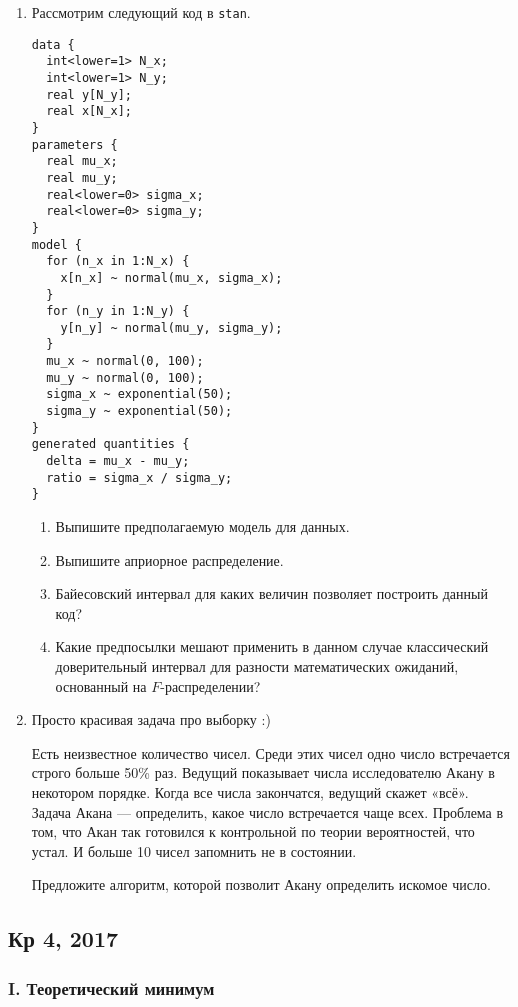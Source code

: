 \begin{enumerate}
\item Рассмотрим следующий код в \verb|stan|.

\begin{verbatim}
data {
  int<lower=1> N_x;
  int<lower=1> N_y;
  real y[N_y];
  real x[N_x];
}
parameters {
  real mu_x;
  real mu_y;
  real<lower=0> sigma_x;
  real<lower=0> sigma_y;
}
model {
  for (n_x in 1:N_x) {
    x[n_x] ~ normal(mu_x, sigma_x);
  }
  for (n_y in 1:N_y) {
    y[n_y] ~ normal(mu_y, sigma_y);
  }
  mu_x ~ normal(0, 100);
  mu_y ~ normal(0, 100);
  sigma_x ~ exponential(50);
  sigma_y ~ exponential(50);
}
generated quantities {
  delta = mu_x - mu_y;
  ratio = sigma_x / sigma_y;
}
\end{verbatim}

\begin{enumerate}
\item Выпишите предполагаемую модель для данных.
\item Выпишите априорное распределение.
\item Байесовский интервал для каких величин позволяет построить данный код?
\item Какие предпосылки мешают применить в данном случае классический доверительный интервал для разности математических ожиданий, основанный на $F$-распределении?
\end{enumerate}

\item Просто красивая задача про выборку :)

Есть неизвестное количество чисел. Среди этих чисел одно число встречается строго больше 50\% раз. Ведущий показывает числа исследователю Акану в некотором порядке. Когда все числа закончатся, ведущий скажет «всё». Задача Акана — определить, какое число встречается чаще всех. Проблема в том, что Акан так готовился к контрольной по теории вероятностей, что устал. И больше 10 чисел запомнить не в состоянии.

Предложите алгоритм, которой позволит Акану определить искомое число.

\end{enumerate}




\subsection{Кр 4, 2017}


\subsubsection*{I. Теоретический минимум}


